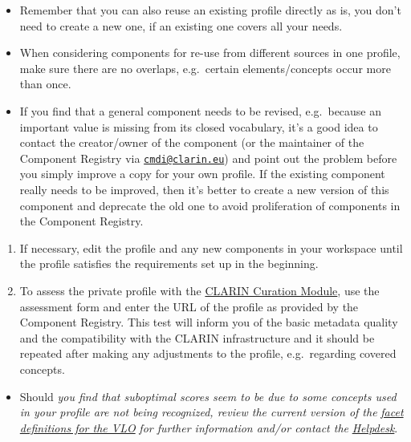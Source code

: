\begin{itemize}
\tightlist
\item
  Remember that you can also reuse an existing profile directly as is,
  you don't need to create a new one, if an existing one covers all your
  needs.
\item
  When considering components for re-use from different sources in one
  profile, make sure there are no overlaps, e.g.~certain
  elements/concepts occur more than once.
\item
  If you find that a general component needs to be revised, e.g.~because
  an important value is missing from its closed vocabulary, it's a good
  idea to contact the creator/owner of the component (or the maintainer
  of the Component Registry via
  \href{mailto:cmdi@clarin.eu}{\nolinkurl{cmdi@clarin.eu}}) and point
  out the problem before you simply improve a copy for your own profile.
  If the existing component really needs to be improved, then it's
  better to create a new version of this component and deprecate the old
  one to avoid proliferation of components in the Component Registry.
\end{itemize}

\begin{enumerate}
\def\labelenumi{\arabic{enumi}.}
\setcounter{enumi}{2}
\tightlist
\item
  If necessary, edit the profile and any new components in your
  workspace until the profile satisfies the requirements set up in the
  beginning.
\item
  To assess the private profile with the
  \href{https://clarin.oeaw.ac.at/curate/}{CLARIN Curation Module}, use
  the assessment form and enter the URL of the profile as provided by
  the Component Registry. This test will inform you of the basic
  metadata quality and the compatibility with the CLARIN infrastructure
  and it should be repeated after making any adjustments to the profile,
  e.g.~regarding covered concepts.
\end{enumerate}

\begin{itemize}
\tightlist
\item
  Should \emph{you find that suboptimal scores seem to be due to some
  concepts used in your profile are not being recognized, review the
  current version of the}
  \href{https://github.com/clarin-eric/VLO/blob/master/vlo-commons/src/main/resources/facetConcepts.xml}{\emph{facet
  definitions for the VLO}} \emph{for further information and/or contact
  the} \href{mailto:vlo@clarin.eu}{\emph{Helpdesk}}.
\end{itemize}

